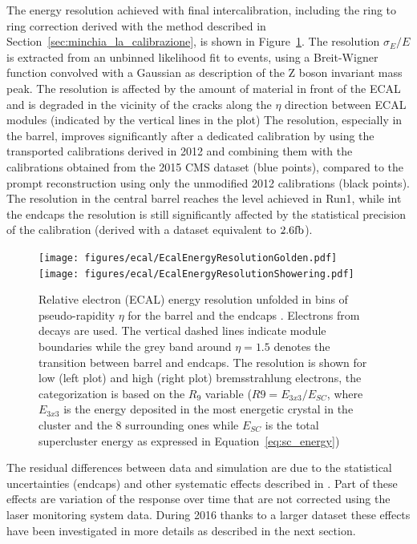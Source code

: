 The energy resolution achieved with final intercalibration, including the ring to ring
correction derived with the method described in Section~\ref{sec:minchia_la_calibrazione},
is shown in Figure~\ref{fig:ecal_res_vs_eta}.
The resolution $\sigma_E/E$ is extracted from an unbinned likelihood fit to \Zee events,
using a Breit-Wigner function convolved with a Gaussian as description of the Z boson invariant mass peak.
The resolution is affected by the amount of material in front of the ECAL and is degraded in the vicinity of
the cracks along the $\eta$ direction between ECAL modules (indicated by the vertical lines in the plot)
The resolution, especially in the barrel, improves significantly after a dedicated calibration by using
the transported calibrations derived in 2012 and combining them with the calibrations obtained
from the 2015 CMS dataset (blue points),
compared to the prompt reconstruction using only the unmodified 2012 calibrations (black points). 
The resolution in the central barrel reaches the level achieved in Run1,
while int the endcaps the resolution is still significantly affected by the statistical precision of the calibration
(derived with a dataset equivalent to $2.6\mathrm{fb}$).

\begin{figure}[h!]
  \centering
  \texttt{[image: figures/ecal/EcalEnergyResolutionGolden.pdf]}
  \texttt{[image: figures/ecal/EcalEnergyResolutionShowering.pdf]}
  \caption{Relative electron (ECAL) energy resolution unfolded in bins of pseudo-rapidity $\eta$
    for the barrel and the endcaps \cite{ecal_dpg_2015}. Electrons from \Zee decays are used.
    The vertical dashed lines indicate module boundaries while the grey band around $\eta = 1.5$ denotes the transition
    between barrel and endcaps.
    The resolution is shown for low (left plot) and high (right plot) bremsstrahlung electrons,
    the categorization is based on the $R_9$ variable ($R9=E_{3x3}/E_{SC}$, where $E_{3x3}$ is the energy
    deposited in the most energetic crystal in the cluster and the 8 surrounding ones while $E_{SC}$ is the total
    supercluster energy as expressed in Equation~\ref{eq:sc_energy})}
  \label{fig:ecal_res_vs_eta}
\end{figure}

The residual differences between data and simulation
are due to the statistical uncertainties (endcaps) and other systematic effects described in \cite{run1_egamma}.
Part of these effects are variation of the response over time that are not corrected using the laser monitoring
system data. During 2016 thanks to a larger dataset these effects have been investigated in more details as
described in the next section.

